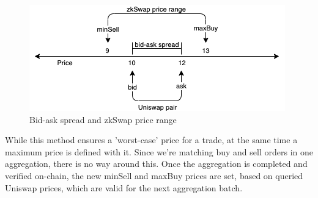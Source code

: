 \documentclass[../../thesis.tex]{subfiles}
\begin{document}
\begin{figure}[h]
    \centerline{\includegraphics[totalheight=3cm]{diagrams/priceing.png}}
    \caption{Bid-ask spread and zkSwap price range}
    \label{fig:price}
\end{figure}

While this method ensures a 'worst-case' price for a trade, at the same time a maximum price is defined with it. Since we're matching buy and sell orders in one aggregation, there is no way around this. Once the aggregation is completed and verified on-chain, the new minSell and maxBuy prices are set, based on queried Uniswap prices, which are valid for the next aggregation batch.
\end{document}
